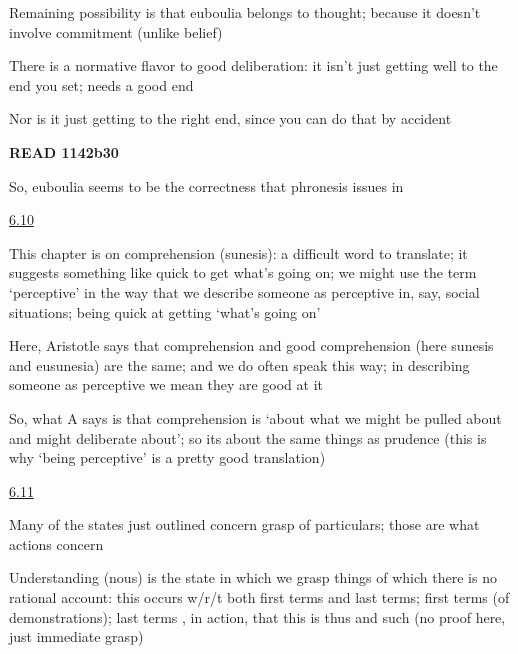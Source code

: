 \documentclass[11pt]{article}
\begin{document}
\noindent Remaining possibility is that euboulia belongs to thought; because it doesn't involve commitment (unlike belief)
\vspace*{2mm}

\noindent There is a normative flavor to good deliberation: it isn't just getting well to the end you set; needs a good end
\vspace*{2mm}

\noindent Nor is it just getting to the right end, since you can do that by accident
\vspace*{2mm}

\noindent\textbf{READ 1142b30}
\vspace*{2mm}

\noindent So, euboulia seems to be the correctness that phronesis issues in
\vspace*{2mm}

\noindent\underline{6.10}
\vspace*{4mm}

\noindent This chapter is on comprehension (sunesis): a difficult word to translate; it suggests something like quick to get what's going on; we might use the term `perceptive' in the way that we describe someone as perceptive in, say, social situations; being quick at getting `what's going on'
\vspace*{2mm}

\noindent Here, Aristotle says that comprehension and good comprehension (here sunesis and eusunesia) are the same; and we do often speak this way; in describing someone as perceptive we mean they are good at it
\vspace*{2mm}

\noindent So, what A says is that comprehension is `about what we might be pulled about and might deliberate about'; so its about the same things as prudence (this is why `being perceptive' is a pretty good translation)
\vspace*{2mm}

\noindent\underline{6.11}
\vspace*{4mm}

\noindent Many of the states just outlined concern grasp of particulars; those are what actions concern
\vspace*{2mm}

\noindent Understanding (nous) is the state in which we grasp things of which there is no rational account: this occurs w/r/t both first terms and last terms; first terms (of demonstrations); last terms , in action, that this is thus and such (no proof here, just immediate grasp)
\vspace*{2mm}
\end{document}
